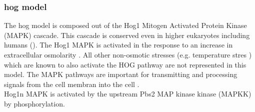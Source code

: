 \subsubsection{hog model}
The hog model is composed out of the Hog1 Mitogen Activated Protein Kinase (MAPK) cascade. This cascade is conserved even in higher eukaryotes including humans (\cite{ASimpleMathematicalModel}). The Hog1 MAPK is activated in the response to an increase in extracellular osmolarity \cite{Saito2012}. All other non-osmotic stresses (e.g. temperature stres \cite{Saito2012}) which are known to also activate the HOG pathway are not represented in this model. The MAPK pathways are important for transmitting and processing signals from the cell membran into the cell \cite{ASimpleMathematicalModel}. \\
Hog1n MAPK is activated by the upstream Pbs2 MAP kinase kinase (MAPKK) by phosphorylation. 


\newpage